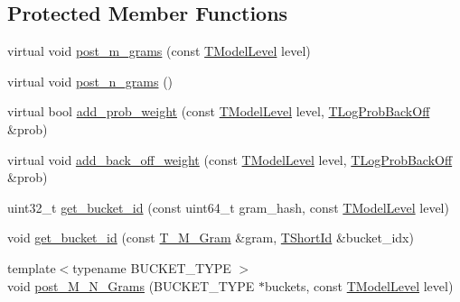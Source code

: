 \subsection*{Protected Member Functions}
\begin{DoxyCompactItemize}
\item 
virtual void \hyperlink{classuva_1_1smt_1_1tries_1_1_g2_d_map_trie_a593414c1e5fbd7522c6ef31643848532}{post\+\_\+m\+\_\+grams} (const \hyperlink{namespaceuva_1_1smt_1_1tries_a20577a44b3a42d26524250634379b7cb}{T\+Model\+Level} level)
\item 
virtual void \hyperlink{classuva_1_1smt_1_1tries_1_1_g2_d_map_trie_a3cb280a715f72c97aaaf4ce0f05e657a}{post\+\_\+n\+\_\+grams} ()
\item 
virtual bool \hyperlink{classuva_1_1smt_1_1tries_1_1_g2_d_map_trie_a116303b3bc78d4df59e1ed09d2270708}{add\+\_\+prob\+\_\+weight} (const \hyperlink{namespaceuva_1_1smt_1_1tries_a20577a44b3a42d26524250634379b7cb}{T\+Model\+Level} level, \hyperlink{namespaceuva_1_1smt_1_1tries_acd0660255dd9ef5d644f01de49102750}{T\+Log\+Prob\+Back\+Off} \&prob)
\item 
virtual void \hyperlink{classuva_1_1smt_1_1tries_1_1_g2_d_map_trie_a48646b91ccd38fcd89969ae5fd39a324}{add\+\_\+back\+\_\+off\+\_\+weight} (const \hyperlink{namespaceuva_1_1smt_1_1tries_a20577a44b3a42d26524250634379b7cb}{T\+Model\+Level} level, \hyperlink{namespaceuva_1_1smt_1_1tries_acd0660255dd9ef5d644f01de49102750}{T\+Log\+Prob\+Back\+Off} \&prob)
\item 
uint32\+\_\+t \hyperlink{classuva_1_1smt_1_1tries_1_1_g2_d_map_trie_ab929b5d16e396c52c1722890248677bf}{get\+\_\+bucket\+\_\+id} (const uint64\+\_\+t gram\+\_\+hash, const \hyperlink{namespaceuva_1_1smt_1_1tries_a20577a44b3a42d26524250634379b7cb}{T\+Model\+Level} level)
\item 
void \hyperlink{classuva_1_1smt_1_1tries_1_1_g2_d_map_trie_ab6b7e50aa34370ce415f3f84bc9ef694}{get\+\_\+bucket\+\_\+id} (const \hyperlink{structuva_1_1smt_1_1tries_1_1mgrams_1_1_t___m___gram}{T\+\_\+\+M\+\_\+\+Gram} \&gram, \hyperlink{namespaceuva_1_1smt_1_1hashing_adcf22e1982ad09d3a63494c006267469}{T\+Short\+Id} \&bucket\+\_\+idx)
\item 
{\footnotesize template$<$typename B\+U\+C\+K\+E\+T\+\_\+\+T\+Y\+P\+E $>$ }\\void \hyperlink{classuva_1_1smt_1_1tries_1_1_g2_d_map_trie_ac60651ab47c923fe8624b35f502c1835}{post\+\_\+\+M\+\_\+\+N\+\_\+\+Grams} (B\+U\+C\+K\+E\+T\+\_\+\+T\+Y\+P\+E $\ast$buckets, const \hyperlink{namespaceuva_1_1smt_1_1tries_a20577a44b3a42d26524250634379b7cb}{T\+Model\+Level} level)
\end{DoxyCompactItemize}
